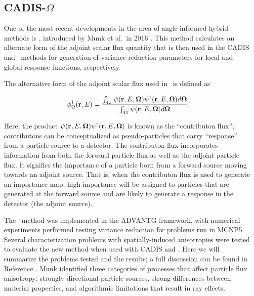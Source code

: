 \subsection{CADIS-$\Omega$}

One of the most recent developments in the area of angle-informed hybrid methods is
\co, introduced by Munk et al.\ in 2016 \cite{cadisom}. This method calculates an
alternate form of the adjoint scalar flux quantity that is then used in the CADIS and
\fwc\ methods for generation of variance reduction parameters for local and global
response functions, respectively.

The alternative form of the adjoint scalar flux used in \co\ is defined as

\begin{equation}
\phi^{\dagger}_{\Omega}(\textbf{r},E) = 
\frac{\int_{4\pi} \psi(\textbf{r} ,E,\mathbf\Omega)\psi^{\dagger}(\textbf{r},E,\mathbf\Omega)d\mathbf\Omega}
{\int_{4\pi}\psi(\textbf{r},E,\mathbf\Omega)d\mathbf\Omega}.
\end{equation}

\noindent Here, the product $\psi(\textbf{r} ,E,\mathbf\Omega)\psi^{\dagger}(\textbf{r},E,\mathbf\Omega)$ is known
as the ``contributon flux''; contributons can be conceptualized as pseudo-particles
that carry ``response'' from a particle source to a detector. The contributon flux
incorporates information from both the forward particle flux as well as the adjoint
particle flux. It signifies the importance of a particle born from a forward source
moving towards an adjoint source. That is, when the contributon flux is used to 
generate an importance map, high importance will be assigned to particles that are
generated at the forward source and are likely to generate a response in the detector
(the adjoint source).

The \co\ method was implemented in the ADVANTG framework, with numerical experiments
performed testing variance reduction for problems run in MCNP5. Several
characterization problems with spatially-induced anisotropies were tested to
evaluate the new method when used with CADIS and \fwc. Here we will summarize the
problems tested and the results; a full discussion can be found in Reference 
\cite{munk}. Munk identified three categories of processes that affect particle flux 
anisotropy: strongly directional particle sources, strong differences between material
properties, and algorithmic limitations that result in ray effects.

